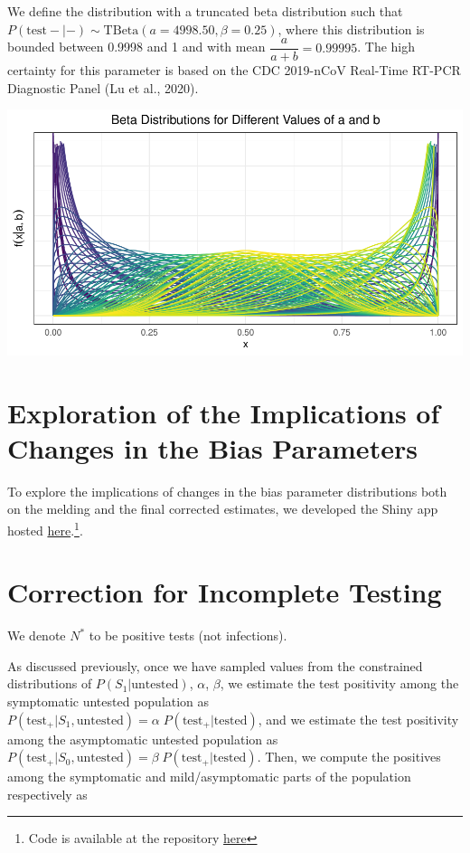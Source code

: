 \documentclass[12pt,twoside]{smiththesis}
\begin{document}
We define the distribution with a truncated beta distribution such that
\(P(\text{test}-| -) \sim \text{TBeta}(a = 4998.50, \beta = 0.25)\), where this distribution is bounded between 0.9998 and 1 and with mean \(\dfrac{a}{a + b} = 0.99995\). The high certainty for this parameter is based on the CDC 2019-nCoV Real-Time RT-PCR Diagnostic Panel (Lu et al., 2020).
\begin{center}\includegraphics[width=0.8\linewidth]{thesis_files/figure-latex/unnamed-chunk-50-1} \end{center}

\hypertarget{exploration-of-the-implications-of-changes-in-the-bias-parameters}{%
\section{Exploration of the Implications of Changes in the Bias Parameters}\label{exploration-of-the-implications-of-changes-in-the-bias-parameters}}

To explore the implications of changes in the bias parameter distributions both on the melding and the final corrected estimates, we developed the Shiny app hosted \href{https://q-w-a.shinyapps.io/bayesian_melding_priors/}{here}.\footnote{Code is available at the repository \href{https://github.com/q-w-a/probabilistic_bias_correction}{here}}.

\hypertarget{correction-for-incomplete-testing}{%
\section{Correction for Incomplete Testing}\label{correction-for-incomplete-testing}}

We denote \(N^*\) to be positive tests (not infections).

As discussed previously, once we have sampled values from the constrained distributions of \(P(S_1|\text{untested})\), \(\alpha\), \(\beta\), we estimate the test positivity among the symptomatic untested population as \(P(\text{test}_+|S_1,\text{untested}) = \alpha \; P(\text{test}_+|\text{tested})\), and we estimate the test positivity among the asymptomatic untested population as \(P(\text{test}_+|S_0,\text{untested}) = \beta \; P(\text{test}_+|\text{tested})\). Then, we compute the positives among the symptomatic and mild/asymptomatic parts of the population respectively as
\end{document}
